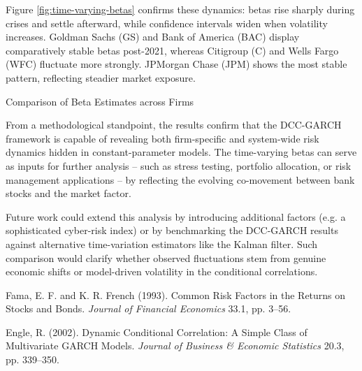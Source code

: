 \documentclass[10pt,parskip=half]{scrartcl}
\numberwithin{equation}{section} %
\numberwithin{figure}{section}   %
\numberwithin{table}{section}    %
\begin{document}
Figure \ref{fig:time-varying-betas} confirms these dynamics: betas rise sharply during crises and settle afterward, while confidence intervals widen when volatility increases.
Goldman Sachs (GS) and Bank of America (BAC) display comparatively stable betas post-2021, whereas Citigroup (C) and Wells Fargo (WFC) fluctuate more strongly.
JPMorgan Chase (JPM) shows the most stable pattern, reflecting steadier market exposure.

\begin{table}[htbp]
\centering
\caption{Comparison of Beta Estimates across Firms}
\label{tab:comparison-table}
\makebox[\textwidth]{
  
}
\end{table}

From a methodological standpoint, the results confirm that the DCC-GARCH framework is capable of revealing both firm-specific and system-wide risk dynamics hidden in constant-parameter models.
The time-varying betas can serve as inputs for further analysis – such as stress testing, portfolio allocation, or risk management applications – by reflecting the evolving co-movement between bank stocks and the market factor.

Future work could extend this analysis by introducing additional factors (e.g. a sophisticated cyber-risk index) or by benchmarking the DCC-GARCH results against alternative time-variation estimators like the Kalman filter.
Such comparison would clarify whether observed fluctuations stem from genuine economic shifts or model-driven volatility in the conditional correlations.


\begin{thebibliography}{9}

Fama, E. F. and K. R. French (1993). Common Risk Factors in the Returns on Stocks and Bonds. \textit{Journal of Financial Economics} 33.1, pp. 3–56.

Engle, R. (2002). Dynamic Conditional Correlation: A Simple Class of Multivariate GARCH Models. \textit{Journal of Business \& Economic Statistics} 20.3, pp. 339–350.

\end{thebibliography}

\end{document}
